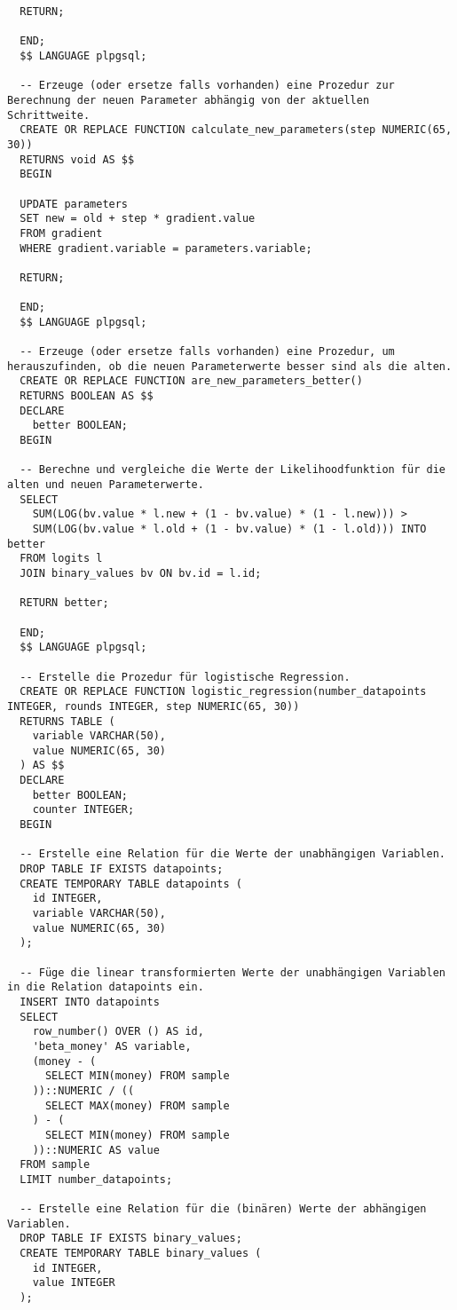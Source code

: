 \begin{verbatim}
  RETURN;

  END;
  $$ LANGUAGE plpgsql;

  -- Erzeuge (oder ersetze falls vorhanden) eine Prozedur zur Berechnung der neuen Parameter abhängig von der aktuellen Schrittweite.
  CREATE OR REPLACE FUNCTION calculate_new_parameters(step NUMERIC(65, 30))
  RETURNS void AS $$
  BEGIN

  UPDATE parameters
  SET new = old + step * gradient.value
  FROM gradient
  WHERE gradient.variable = parameters.variable;

  RETURN;

  END;
  $$ LANGUAGE plpgsql;

  -- Erzeuge (oder ersetze falls vorhanden) eine Prozedur, um herauszufinden, ob die neuen Parameterwerte besser sind als die alten.
  CREATE OR REPLACE FUNCTION are_new_parameters_better()
  RETURNS BOOLEAN AS $$
  DECLARE
    better BOOLEAN;
  BEGIN

  -- Berechne und vergleiche die Werte der Likelihoodfunktion für die alten und neuen Parameterwerte.
  SELECT
    SUM(LOG(bv.value * l.new + (1 - bv.value) * (1 - l.new))) >
    SUM(LOG(bv.value * l.old + (1 - bv.value) * (1 - l.old))) INTO better
  FROM logits l
  JOIN binary_values bv ON bv.id = l.id;

  RETURN better;

  END;
  $$ LANGUAGE plpgsql;

  -- Erstelle die Prozedur für logistische Regression.
  CREATE OR REPLACE FUNCTION logistic_regression(number_datapoints INTEGER, rounds INTEGER, step NUMERIC(65, 30))
  RETURNS TABLE (
    variable VARCHAR(50),
    value NUMERIC(65, 30)
  ) AS $$
  DECLARE
    better BOOLEAN;
    counter INTEGER;
  BEGIN

  -- Erstelle eine Relation für die Werte der unabhängigen Variablen.
  DROP TABLE IF EXISTS datapoints;
  CREATE TEMPORARY TABLE datapoints (
    id INTEGER,
    variable VARCHAR(50),
    value NUMERIC(65, 30)
  );

  -- Füge die linear transformierten Werte der unabhängigen Variablen in die Relation datapoints ein.
  INSERT INTO datapoints
  SELECT
    row_number() OVER () AS id,
    'beta_money' AS variable,
    (money - (
      SELECT MIN(money) FROM sample
    ))::NUMERIC / ((
      SELECT MAX(money) FROM sample
    ) - (
      SELECT MIN(money) FROM sample
    ))::NUMERIC AS value
  FROM sample
  LIMIT number_datapoints;

  -- Erstelle eine Relation für die (binären) Werte der abhängigen Variablen.
  DROP TABLE IF EXISTS binary_values;
  CREATE TEMPORARY TABLE binary_values (
    id INTEGER,
    value INTEGER
  );


\end{verbatim}
